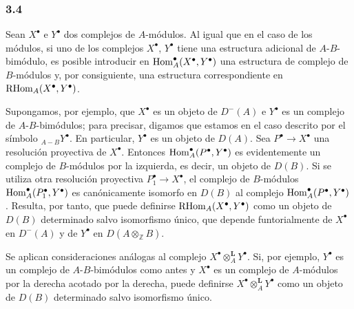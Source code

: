 \subsubsection*{3.4}

Sean $X^\bullet$ e $Y^\bullet$ dos complejos de $A$-módulos. Al igual que en el caso de los módulos, si uno de los complejos $X^\bullet$, $Y^\bullet$ tiene una estructura adicional de $A$-$B$-bimódulo, es posible introducir en $\operatorname{Hom}_A^\bullet(X^\bullet,Y^\bullet)$ una estructura de complejo de $B$-módulos y, por consiguiente, una estructura correspondiente en $\mathrm{RHom}_A(X^\bullet,Y^\bullet)$.

Supongamos, por ejemplo, que $X^\bullet$ es un objeto de $D^-(A)$ e $Y^\bullet$ es un complejo de $A$-$B$-bimódulos; para precisar, digamos que estamos en el caso descrito por el símbolo ${}_{A-B}Y^\bullet$. En particular, $Y^\bullet$ es un objeto de $D(A)$. Sea $P^\bullet\to X^\bullet$ una resolución proyectiva de $X^\bullet$. Entonces $\operatorname{Hom}_A^\bullet(P^\bullet,Y^\bullet)$ es evidentemente un complejo de $B$-módulos por la izquierda, es decir, un objeto de $D(B)$. Si se utiliza otra resolución proyectiva $P_1^\bullet\to X^\bullet$, el complejo de $B$-módulos $\operatorname{Hom}_A^\bullet(P_1^\bullet,Y^\bullet)$ es canónicamente isomorfo en $D(B)$ al complejo $\operatorname{Hom}_A^\bullet(P^\bullet,Y^\bullet)$. Resulta, por tanto, que puede definirse $\mathrm{RHom}_A(X^\bullet,Y^\bullet)$ como un objeto de $D(B)$ determinado salvo isomorfismo único, que depende funtorialmente de $X^\bullet$ en $D^-(A)$ y de $Y^\bullet$ en $D(A\otimes_{\mathbb Z}B)$.

Se aplican consideraciones análogas al complejo $X^\bullet\otimes_A^{\mathbf L}Y^\bullet$. Si, por ejemplo, $Y^\bullet$ es un complejo de $A$-$B$-bimódulos como antes y $X^\bullet$ es un complejo de $A$-módulos por la derecha acotado por la derecha, puede definirse $X^\bullet\otimes_A^{\mathbf L}Y^\bullet$ como un objeto de $D(B)$ determinado salvo isomorfismo único.
